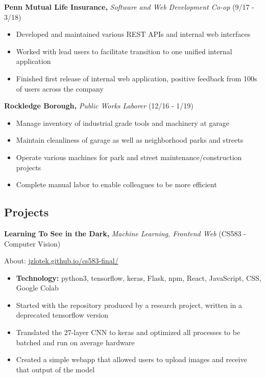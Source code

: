 \documentclass[10pt]{article}
\begin{document}
\vspace{-0.5em}
\textbf{Penn Mutual Life Insurance,}
\emph{Software and Web Development Co-op}
(9/17 - 3/18)

\vspace{-\topsep}
\begin{itemize}
\setlength\itemsep{-0.5em}
\item Developed and maintained various REST APIs and internal web interfaces
\item Worked with lead users to facilitate transition to one unified
	internal application
\item Finished first release of internal web application, positive feedback from
  100s of users across the company
\end{itemize}

\vspace{-0.5em}
\textbf{Rockledge Borough,}
\emph{Public Works Laborer}
(12/16 - 1/19)

\vspace{-\topsep}
\begin{itemize}
\setlength\itemsep{-0.5em}
\item Manage inventory of industrial grade tools and machinery
at garage
\item Maintain cleanliness of garage as well as neighborhood
parks and streets
\item Operate various machines for park and street
	maintenance/construction projects
\item Complete manual labor to enable colleagues to be more
efficient
\end{itemize}

\vspace{-2em}
\subsection*{Projects}%
\label{sub:Projects}

\vspace{-0.5em}
\textbf{Learning To See in the Dark,}
\emph{Machine Learning, Frontend Web}
(CS583 - Computer Vision)

\indent \indent About: \href{https://jzlotek.github.io/cs583-final/}{jzlotek.github.io/cs583-final/}

\vspace{-\topsep}
\begin{itemize}
\setlength\itemsep{-0.5em}
\item \textbf{Technology:} python3, tensorflow, keras, Flask, npm, React, JavaScript, CSS, Google Colab
\item Started with the repository produced by a research project, written in a deprecated tensorflow version
\item Translated the 27-layer CNN to keras and optimized all processes to be batched and run on average hardware
\item Created a simple webapp that allowed users to upload images and receive that output of the model
\end{itemize}
\end{document}
